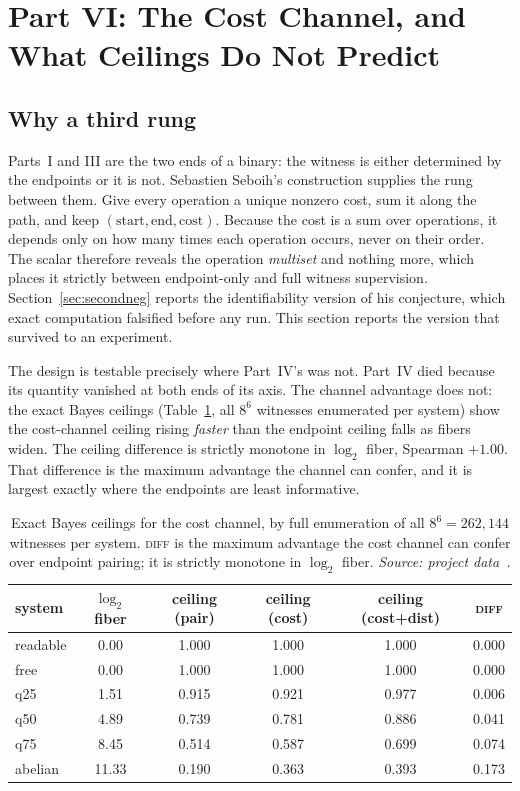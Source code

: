 \section{Part VI: The Cost Channel, and What Ceilings Do Not Predict}\label{sec:part6}

\subsection{Why a third rung}

Parts~I and III are the two ends of a binary: the witness is either determined by the endpoints or it is not. Sebastien Seboih's construction supplies the rung between them. Give every operation a unique nonzero cost, sum it along the path, and keep $(\text{start}, \text{end}, \text{cost})$. Because the cost is a sum over operations, it depends only on how many times each operation occurs, never on their order. The scalar therefore reveals the operation \emph{multiset} and nothing more, which places it strictly between endpoint-only and full witness supervision. Section~\ref{sec:secondneg} reports the identifiability version of his conjecture, which exact computation falsified before any run. This section reports the version that survived to an experiment.

The design is testable precisely where Part~IV's was not. Part~IV died because its quantity vanished at both ends of its axis. The channel advantage does not: the exact Bayes ceilings (Table~\ref{tab:ccceil}, all $8^6$ witnesses enumerated per system) show the cost-channel ceiling rising \emph{faster} than the endpoint ceiling falls as fibers widen. The ceiling difference is strictly monotone in $\log_2$ fiber, Spearman $+1.00$. That difference is the maximum advantage the channel can confer, and it is largest exactly where the endpoints are least informative.

\begin{table}[htbp]
\centering\footnotesize
\caption{Exact Bayes ceilings for the cost channel, by full enumeration of all $8^6 = 262{,}144$ witnesses per system. \textsc{diff} is the maximum advantage the cost channel can confer over endpoint pairing; it is strictly monotone in $\log_2$ fiber. \emph{Source: project data~\cite{appliedrepo2026}.}}
\label{tab:ccceil}
\begin{tabular}{lccccc}
\toprule
system & $\log_2$ fiber & ceiling (pair) & ceiling (cost) & ceiling (cost+dist) & \textsc{diff} \\
\midrule
readable & 0.00 & 1.000 & 1.000 & 1.000 & 0.000 \\
free & 0.00 & 1.000 & 1.000 & 1.000 & 0.000 \\
q25 & 1.51 & 0.915 & 0.921 & 0.977 & 0.006 \\
q50 & 4.89 & 0.739 & 0.781 & 0.886 & 0.041 \\
q75 & 8.45 & 0.514 & 0.587 & 0.699 & 0.074 \\
abelian & 11.33 & 0.190 & 0.363 & 0.393 & 0.173 \\
\bottomrule
\end{tabular}
\end{table}

